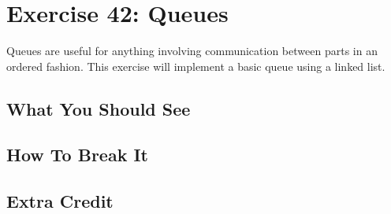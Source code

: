\chapter{Exercise 42: Queues}

Queues are useful for anything involving communication between parts in an ordered fashion.
This exercise will implement a basic queue using a linked list.




\section{What You Should See}


\section{How To Break It}


\section{Extra Credit}



